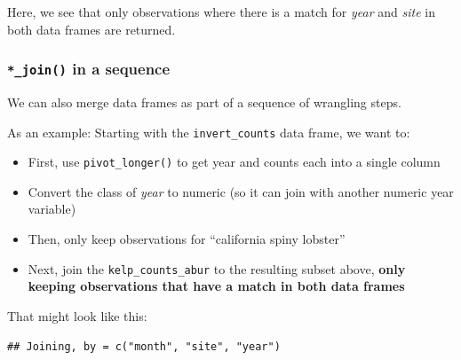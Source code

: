 \documentclass[]{book}
\newenvironment{Shaded}{\begin{snugshade}}{\end{snugshade}}
\newcommand{\DataTypeTok}[1]{\textcolor[rgb]{0.13,0.29,0.53}{#1}}
\newcommand{\KeywordTok}[1]{\textcolor[rgb]{0.13,0.29,0.53}{\textbf{#1}}}
\newcommand{\NormalTok}[1]{#1}
\newcommand{\OperatorTok}[1]{\textcolor[rgb]{0.81,0.36,0.00}{\textbf{#1}}}
\newcommand{\StringTok}[1]{\textcolor[rgb]{0.31,0.60,0.02}{#1}}
\providecommand{\tightlist}{%
  \setlength{\itemsep}{0pt}\setlength{\parskip}{0pt}}
\begin{document}
Here, we see that only observations where there is a match for \emph{year} and \emph{site} in both data frames are returned.

\hypertarget{join-in-a-sequence}{%
\subsubsection{\texorpdfstring{\texttt{*\_join()} in a sequence}{*\_join() in a sequence}}\label{join-in-a-sequence}}

We can also merge data frames as part of a sequence of wrangling steps.

As an example: Starting with the \texttt{invert\_counts} data frame, we want to:

\begin{itemize}
\tightlist
\item
  First, use \texttt{pivot\_longer()} to get year and counts each into a single column
\item
  Convert the class of \emph{year} to numeric (so it can join with another numeric year variable)
\item
  Then, only keep observations for ``california spiny lobster''
\item
  Next, join the \texttt{kelp\_counts\_abur} to the resulting subset above, \textbf{only keeping observations that have a match in both data frames}
\end{itemize}

That might look like this:

\begin{Shaded}
\end{Shaded}

\begin{verbatim}
## Joining, by = c("month", "site", "year")
\end{verbatim}
\end{document}
